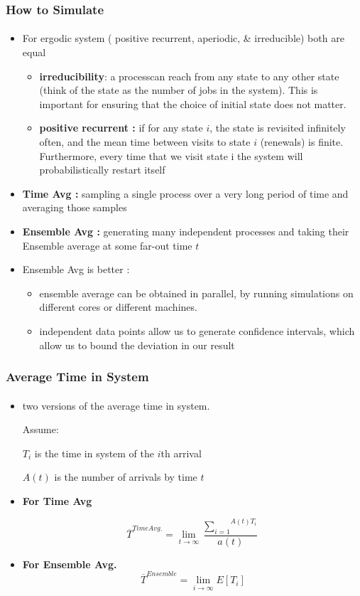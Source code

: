 \documentclass{beamer}
\begin{document}
\begin{frame}
\frametitle{How to Simulate }
\framesubtitle{\textbf{\textit{}}}
\begin{itemize}
\item For ergodic system ( positive recurrent, aperiodic, \& irreducible) both are equal
\begin{itemize}
\item \textbf{irreducibility}: a processcan reach from any state to any other state (think of the state as the number of jobs in the system). This
is important for ensuring that the choice of initial state does not matter.

\item  \textbf{positive recurrent :} if for any state $i$, the state is revisited infinitely often, and the mean time between visits
to state $i$ (renewals) is finite. Furthermore, every time that we visit state i the system will probabilistically restart itself

\end{itemize} 
\item \textbf{Time Avg :} sampling a single process over a very long period of time and averaging those samples
\item \textbf{Ensemble Avg :} generating many independent processes and taking their Ensemble average at some far-out time $t$ 

\item {Ensemble Avg is better :}

\begin{itemize}
\item ensemble average can be obtained in parallel, by running simulations on different cores or different machines.

\item  independent data points allow us to generate
confidence intervals, which allow us to bound the deviation in our result
\end{itemize}

\end{itemize}	    
    
\end{frame}

\begin{frame}
\frametitle{Average Time in System }
\framesubtitle{\textbf{\textit{}}}
\begin{itemize}
\item two versions of the average time in system. 

Assume:

$T_i$ is the time in system of the $i$th arrival 

$ A(t)$ is the number of arrivals by time $t$

\item \textbf{For Time Avg}

$$ \overline{T}^{Time Avg.} = {{\lim}_{t \rightarrow \infty}} 
\frac{{{\sum}_{i=1}}^{A(t) T_i} }{a(t)} $$

\item \textbf{For Ensemble Avg.}
$$ \overline{T}^{Ensemble} = \lim_{i \rightarrow \infty} E[T_i] $$
\end{itemize}	    
    
\end{frame}
    
\end{document}
